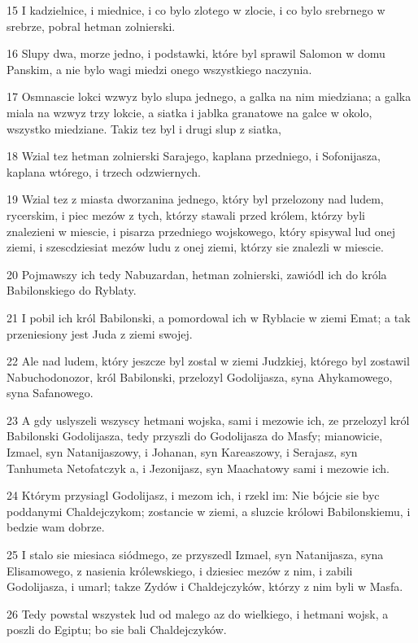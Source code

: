 \par 15 I kadzielnice, i miednice, i co bylo zlotego w zlocie, i co bylo srebrnego w srebrze, pobral hetman zolnierski.
\par 16 Slupy dwa, morze jedno, i podstawki, które byl sprawil Salomon w domu Panskim, a nie bylo wagi miedzi onego wszystkiego naczynia.
\par 17 Osmnascie lokci wzwyz bylo slupa jednego, a galka na nim miedziana; a galka miala na wzwyz trzy lokcie, a siatka i jablka granatowe na galce w okolo, wszystko miedziane. Takiz tez byl i drugi slup z siatka,
\par 18 Wzial tez hetman zolnierski Sarajego, kaplana przedniego, i Sofonijasza, kaplana wtórego, i trzech odzwiernych.
\par 19 Wzial tez z miasta dworzanina jednego, który byl przelozony nad ludem, rycerskim, i piec mezów z tych, którzy stawali przed królem, którzy byli znalezieni w miescie, i pisarza przedniego wojskowego, który spisywal lud onej ziemi, i szescdziesiat mezów ludu z onej ziemi, którzy sie znalezli w miescie.
\par 20 Pojmawszy ich tedy Nabuzardan, hetman zolnierski, zawiódl ich do króla Babilonskiego do Ryblaty.
\par 21 I pobil ich król Babilonski, a pomordowal ich w Ryblacie w ziemi Emat; a tak przeniesiony jest Juda z ziemi swojej.
\par 22 Ale nad ludem, który jeszcze byl zostal w ziemi Judzkiej, którego byl zostawil Nabuchodonozor, król Babilonski, przelozyl Godolijasza, syna Ahykamowego, syna Safanowego.
\par 23 A gdy uslyszeli wszyscy hetmani wojska, sami i mezowie ich, ze przelozyl król Babilonski Godolijasza, tedy przyszli do Godolijasza do Masfy; mianowicie, Izmael, syn Natanijaszowy, i Johanan, syn Kareaszowy, i Serajasz, syn Tanhumeta Netofatczyk a, i Jezonijasz, syn Maachatowy sami i mezowie ich.
\par 24 Którym przysiagl Godolijasz, i mezom ich, i rzekl im: Nie bójcie sie byc poddanymi Chaldejczykom; zostancie w ziemi, a sluzcie królowi Babilonskiemu, i bedzie wam dobrze.
\par 25 I stalo sie miesiaca siódmego, ze przyszedl Izmael, syn Natanijasza, syna Elisamowego, z nasienia królewskiego, i dziesiec mezów z nim, i zabili Godolijasza, i umarl; takze Zydów i Chaldejczyków, którzy z nim byli w Masfa.
\par 26 Tedy powstal wszystek lud od malego az do wielkiego, i hetmani wojsk, a poszli do Egiptu; bo sie bali Chaldejczyków.
